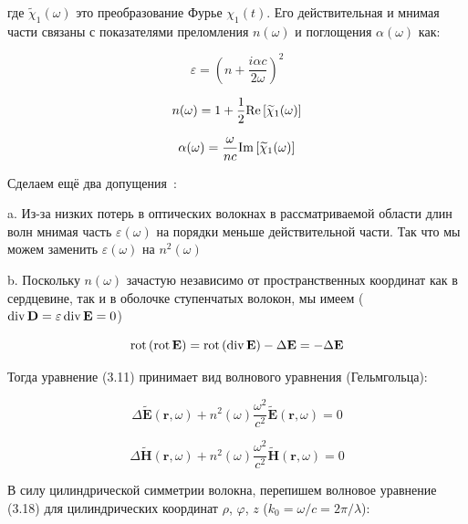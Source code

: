 где $\widetilde{\chi}_1(\omega)$ это преобразование Фурье $\chi_1(t)$. Его действительная и мнимая части связаны с показателями преломления $n(\omega)$ и поглощения $\alpha(\omega)$ как:

\begin{equation}
	\varepsilon = \left( n + \frac{i \alpha c}{2\omega} \right) ^2
\end{equation}

\begin{equation}
	n(\omega) = 1 + \frac{1}{2} \mathrm{Re} \left[ \widetilde{\chi}_1(\omega) \right]
\end{equation}

\begin{equation}
	\alpha(\omega) = \frac{\omega}{nc} \mathrm{Im} \left[ \widetilde{\chi}_1(\omega) \right]
\end{equation}

Сделаем ещё два допущения~\cite{agrawal2007nonlinear}:

a. Из-за низких потерь в оптических волокнах в рассматриваемой области длин волн мнимая часть $\varepsilon(\omega)$ на порядки меньше действительной части. Так что мы можем заменить $\varepsilon(\omega)$ на $n^2(\omega)$

b. Поскольку $n(\omega)$ зачастую независимо от пространственных координат как в сердцевине, так и в оболочке ступенчатых волокон, мы имеем ($\mathop{\mathrm{div}}\nolimits \mathbf{D} = \varepsilon \mathop{\mathrm{div}}\nolimits \mathbf{E} = 0$)

\begin{equation}
	\mathop{\mathrm{rot}}\nolimits{\left( \mathop{\mathrm{rot}}\nolimits\mathbf{E} \right)} = \mathop{\mathrm{rot}}\nolimits{\left( \mathop{\mathrm{div}}\nolimits\mathbf{E} \right)} - \Delta \mathbf{E} = - \Delta \mathbf{E}
\end{equation}

Тогда уравнение (3.11) принимает вид волнового уравнения (Гельмгольца):

\begin{equation}
	\Delta \widetilde{\mathbf{E}}(\mathbf{r}, \omega) + n^2(\omega) \frac{\omega^2}{c^2} \widetilde{\mathbf{E}}(\mathbf{r}, \omega) = 0
\end{equation}

\begin{equation}
	\Delta \widetilde{\mathbf{H}}(\mathbf{r}, \omega) + n^2(\omega) \frac{\omega^2}{c^2} \widetilde{\mathbf{H}}(\mathbf{r}, \omega) = 0
\end{equation}

В силу цилиндрической симметрии волокна, перепишем волновое уравнение (3.18) для цилиндрических координат $\rho$, $\varphi$, $z$ ($k_0 = \omega / c = 2\pi / \lambda$):

